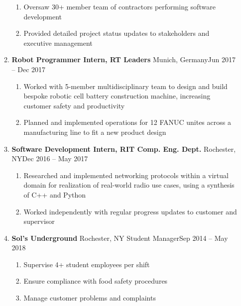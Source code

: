 \documentclass[11pt]{article}
\newcommand{\customBulletLabel}{\raisebox{0.4ex}{\tiny$\bullet$}}   %
\begin{document}
\begin{center}
\begin{enumerate}[label={}, leftmargin=0pt, parsep=5pt]
\begin{enumerate}[label={}, itemsep=5pt]
\begin{enumerate}[label={{\boldmath$\cdot$}}]
            \item Oversaw 30+ member team of contractors performing software development
            \item Provided detailed project status updates to stakeholders and executive management
        \end{enumerate}
        \item \textbf{Robot Programmer Intern, RT Leaders} \textbar{} Munich, Germany\hfill Jun 2017 -- Dec 2017
        \begin{enumerate}[label={\customBulletLabel}]
            \item Worked with 5-member multidisciplinary team to design and build bespoke robotic cell battery construction machine, increasing customer safety and productivity
            \item Planned and implemented operations for 12 FANUC unites across a manufacturing line to fit a new product design
        \end{enumerate}
        \item \textbf{Software Development Intern, RIT Comp. Eng. Dept.} \textbar{} Rochester, NY\hfill Dec 2016 -- May 2017
        \begin{enumerate}[label={--}]
            \item Researched and implemented networking protocols within a virtual domain for realization of real-world radio use cases, using a synthesis of C++ and Python
            \item Worked independently with regular progress updates to customer and supervisor 
        \end{enumerate}
        \item \textbf{Sol's Underground} \textbar{} Rochester, NY \textbar{} Student Manager\hfill Sep 2014 -- May 2018
        \begin{enumerate}[label={--}]
            \item Supervise 4+ student employees per shift
            \item Ensure compliance with food safety procedures
            \item Manage customer problems and complaints
        \end{enumerate}
    \end{enumerate}
\end{enumerate}
\end{center}
\end{document}
